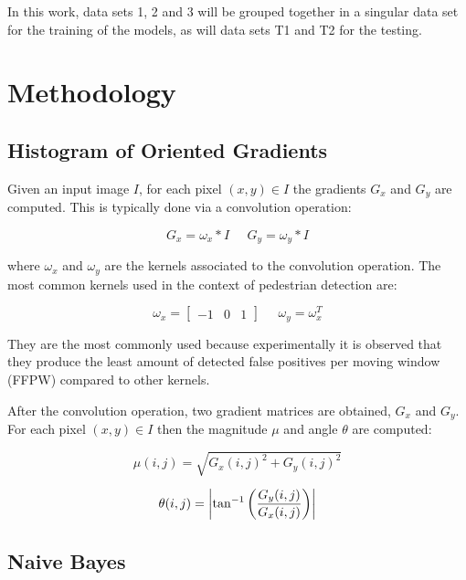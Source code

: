 \documentclass[journal,twocolumn]{IEEEtran}
\begin{document}
In this work, data sets 1, 2 and 3 will be grouped together in a singular data set for the training of the models, as will data sets T1 and T2 for the testing.

\section{Methodology}
\label{sec:meth}

\subsection{Histogram of Oriented Gradients}

Given an input image $I$, for each pixel $(x,y)\in I$ the gradients $G_x$ and $G_y$ are computed. This is typically done via a convolution operation:

\begin{equation}
G_x=\omega_x* I\;\;\;\;\;G_y=\omega_y* I
\end{equation}

where $\omega_x$ and $\omega_y$ are the kernels associated to the convolution operation. The most common kernels used in the context of pedestrian detection are:

\begin{equation*}
\omega_x=\begin{bmatrix}
-1 & 0 & 1
\end{bmatrix}\;\;\;\;\;\omega_y=\omega_x^T
\end{equation*}

They are the most commonly used because experimentally it is observed\cite{2} that they produce the least amount of detected false positives per moving window (FFPW) compared to other kernels.

After the convolution operation, two gradient matrices are obtained, $G_x$ and $G_y$. For each pixel $(x,y)\in I$ then the magnitude $\mu$ and angle $\theta$ are computed:

\begin{equation}
\mu(i,j)=\sqrt{G_x(i,j)^2+G_y(i,j)^2}
\end{equation}

\begin{equation*}
\theta(i,j)=\abs{\tan^{-1}\left(\frac{G_y(i,j)}{G_x(i,j)}\right)}
\end{equation*}

\subsection{Naive Bayes}
\end{document}
